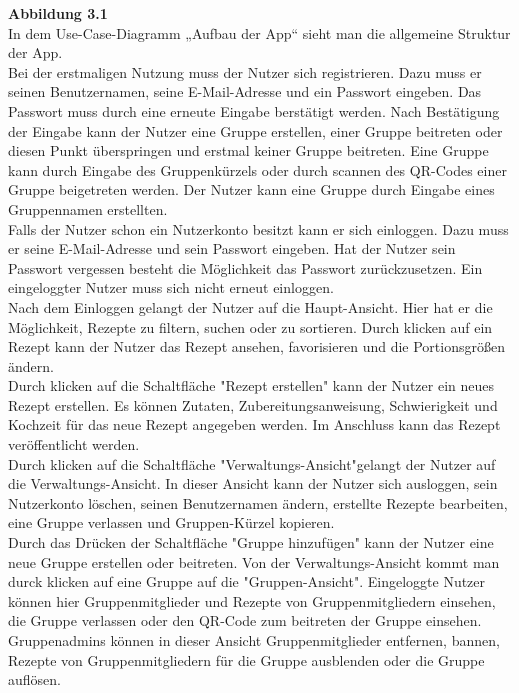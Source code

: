 \documentclass[parskip=full]{scrartcl}
\begin{document}
\textbf{Abbildung 3.1}\\
In dem Use-Case-Diagramm „Aufbau der App“ sieht man die allgemeine Struktur der App.\\
Bei der erstmaligen Nutzung muss der Nutzer sich registrieren.
Dazu muss er seinen Benutzernamen, seine E-Mail-Adresse und ein Passwort eingeben.
Das Passwort muss durch eine erneute Eingabe berstätigt werden.
Nach Bestätigung der Eingabe kann der Nutzer eine Gruppe erstellen, einer Gruppe beitreten oder diesen Punkt überspringen und erstmal keiner Gruppe beitreten.
Eine Gruppe kann durch Eingabe des Gruppenkürzels oder durch scannen des QR-Codes einer Gruppe beigetreten werden.
Der Nutzer kann eine Gruppe durch Eingabe eines Gruppennamen erstellten.\\
Falls der Nutzer schon ein Nutzerkonto besitzt kann er sich einloggen.
Dazu muss er seine E-Mail-Adresse und sein Passwort eingeben.
Hat der Nutzer sein Passwort vergessen besteht die Möglichkeit das Passwort zurückzusetzen.
Ein eingeloggter Nutzer muss sich nicht erneut einloggen.\\
Nach dem Einloggen gelangt der Nutzer auf die Haupt-Ansicht.
Hier hat er die Möglichkeit, Rezepte zu filtern, suchen oder zu sortieren.
Durch klicken auf ein Rezept kann der Nutzer das Rezept ansehen, favorisieren und die Portionsgrößen ändern.\\
Durch klicken auf die Schaltfläche "Rezept erstellen" kann der Nutzer ein neues Rezept erstellen.
Es können Zutaten, Zubereitungsanweisung, Schwierigkeit und Kochzeit ƒür das neue Rezept angegeben werden.
Im Anschluss kann das Rezept veröffentlicht werden.\\
Durch klicken auf die Schaltfläche "Verwaltungs-Ansicht"\space gelangt der Nutzer auf die \glqq Verwaltungs-Ansicht\grqq.
In dieser Ansicht kann der Nutzer sich ausloggen, sein Nutzerkonto löschen, seinen Benutzernamen ändern, 
erstellte Rezepte bearbeiten, eine Gruppe verlassen und Gruppen-Kürzel kopieren.\\
Durch das Drücken der Schaltfläche "Gruppe hinzufügen" kann der Nutzer eine neue Gruppe erstellen oder beitreten.
Von der Verwaltungs-Ansicht kommt man durck klicken auf eine Gruppe auf die "Gruppen-Ansicht".
Eingeloggte Nutzer können hier Gruppenmitglieder und Rezepte von Gruppenmitgliedern einsehen, die Gruppe verlassen oder den QR-Code zum beitreten der Gruppe einsehen.
Gruppenadmins können in dieser Ansicht Gruppenmitglieder entfernen, bannen, Rezepte von Gruppenmitgliedern für die Gruppe ausblenden oder die Gruppe auflösen.
\end{document}
